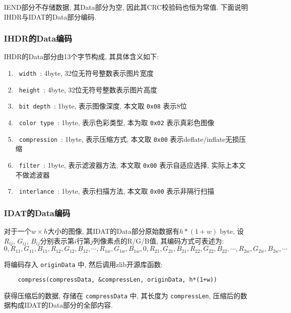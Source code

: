 \documentclass[UTF8]{ctexart}
\begin{document}
IEND部分不存储数据, 其Data部分为空, 因此其CRC校验码也恒为常值. 下面说明IHDR与IDAT的Data部分编码.

\subsubsection{IHDR的Data编码}

IHDR的Data部分由13个字节构成, 其具体含义如下: 

\begin{enumerate}[itemindent=2em]
    \setlength{\itemsep}{-5pt}
    \item \verb| width |: 4byte, 32位无符号整数表示图片宽度
    \item \verb| height |: 4byte, 32位无符号整数表示图片高度
    \item \verb| bit depth |: 1byte, 表示图像深度, 本文取 \verb |0x08| 表示8位
    \item \verb| color type |: 1byte, 表示色彩类型, 本为取 \verb |0x02| 表示真彩色图像
    \item \verb| compression |: 1byte, 表示压缩方式, 本文取 \verb |0x00| 表示deflate/inflate无损压缩
    \item \verb| filter |: 1byte, 表示滤波器方法, 本文取 \verb |0x00| 表示自适应选择, 实际上本文不做滤波器
    \item \verb| interlance |: 1byte, 表示扫描方法, 本文取 \verb |0x00| 表示非隔行扫描
\end{enumerate}

\subsubsection{IDAT的Data编码}

对于一个$w\times h$大小的图像, 其IDAT的Data部分原始数据有$h*(1+w)$ byte, 设$R_{ij}$, $G_{ij}$, $B_{ij}$分别表示第$i$行第$j$列像素点的R/G/B值, 其编码方式可表述为: 
\begin{equation*}
    0,R_{11},G_{11},B_{11},R_{12},G_{12},B_{12},\cdots,R_{1w},G_{1w},B_{1w},0,R_{21},G_{21},B_{21},R_{22},G_{22},B_{22},\cdots,R_{2w},G_{2w},B_{2w},\cdots
\end{equation*}

将编码存入 \verb |originData| 中, 然后调用zlib开源库函数: 

\begin{verbatim}
    compress(compressData, &compressLen, originData, h*(1+w))
\end{verbatim}

获得压缩后的数据, 存储在 \verb |compressData| 中, 其长度为 \verb |compressLen|, 压缩后的数据构成IDAT的Data部分的全部内容.
\end{document}
